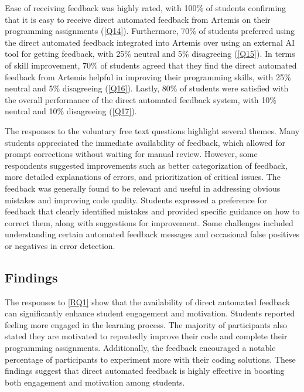 \documentclass[manuscript,screen,review]{acmart}
\begin{document}
Ease of receiving feedback was highly rated, with 100\% of students confirming that it is easy to receive direct automated feedback from Artemis on their programming assignments (\ref{Q14}).
Furthermore, 70\% of students preferred using the direct automated feedback integrated into Artemis over using an external AI tool for getting feedback, with 25\% neutral and 5\% disagreeing (\ref{Q15}).
In terms of skill improvement, 70\% of students agreed that they find the direct automated feedback from Artemis helpful in improving their programming skills, with 25\% neutral and 5\% disagreeing (\ref{Q16}).
Lastly, 80\% of students were satisfied with the overall performance of the direct automated feedback system, with 10\% neutral and 10\% disagreeing (\ref{Q17}).


The responses to the voluntary free text questions highlight several themes.
Many students appreciated the immediate availability of feedback, which allowed for prompt corrections without waiting for manual review. 
However, some respondents suggested improvements such as better categorization of feedback, more detailed explanations of errors, and prioritization of critical issues. 
The feedback was generally found to be relevant and useful in addressing obvious mistakes and improving code quality. 
Students expressed a preference for feedback that clearly identified mistakes and provided specific guidance on how to correct them, along with suggestions for improvement. 
Some challenges included understanding certain automated feedback messages and occasional false positives or negatives in error detection.


\subsection{Findings}

The responses to \ref{RQ1} show that the availability of direct automated feedback can significantly enhance student engagement and motivation.
Students reported feeling more engaged in the learning process.
The majority of participants also stated they are motivated to repeatedly improve their code and complete their programming assignments.
Additionally, the feedback encouraged a notable percentage of participants to experiment more with their coding solutions.
These findings suggest that direct automated feedback is highly effective in boosting both engagement and motivation among students.
\end{document}
